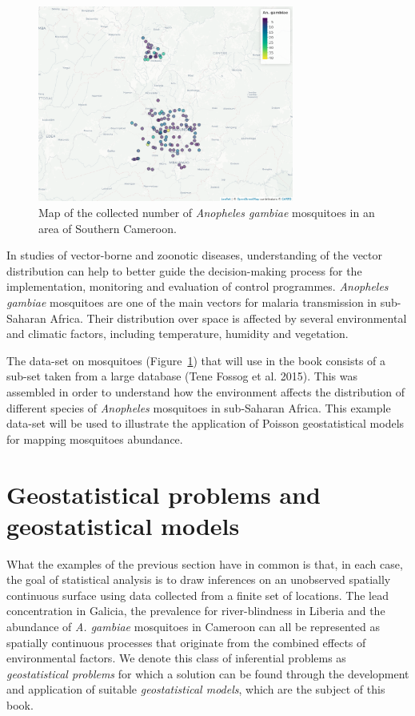 \documentclass[
  letterpaper,
]{krantz}
\begin{document}
\begin{figure}

{\centering \includegraphics[width=3.31in,height=\textheight]{./figures/anopheles_ch1.png}

}

\caption{\label{fig-anopheles-ch1}Map of the collected number of
\emph{Anopheles gambiae} mosquitoes in an area of Southern Cameroon.}

\end{figure}

In studies of vector-borne and zoonotic diseases, understanding of the
vector distribution can help to better guide the decision-making process
for the implementation, monitoring and evaluation of control programmes.
\emph{Anopheles gambiae} mosquitoes are one of the main vectors for
malaria transmission in sub-Saharan Africa. Their distribution over
space is affected by several environmental and climatic factors,
including temperature, humidity and vegetation.

The data-set on mosquitoes (Figure~\ref{fig-anopheles-ch1}) that will
use in the book consists of a sub-set taken from a large database (Tene
Fossog et al. 2015). This was assembled in order to understand how the
environment affects the distribution of different species of
\emph{Anopheles} mosquitoes in sub-Saharan Africa. This example data-set
will be used to illustrate the application of Poisson geostatistical
models for mapping mosquitoes abundance.

\hypertarget{sec-geostat-models}{%
\section{Geostatistical problems and geostatistical
models}\label{sec-geostat-models}}

What the examples of the previous section have in common is that, in
each case, the goal of statistical analysis is to draw inferences on an
unobserved spatially continuous surface using data collected from a
finite set of locations. The lead concentration in Galicia, the
prevalence for river-blindness in Liberia and the abundance of \emph{A.
gambiae} mosquitoes in Cameroon can all be represented as spatially
continuous processes that originate from the combined effects of
environmental factors. We denote this class of inferential problems as
\emph{geostatistical problems} for which a solution can be found through
the development and application of suitable \emph{geostatistical
models}, which are the subject of this book.
\end{document}
